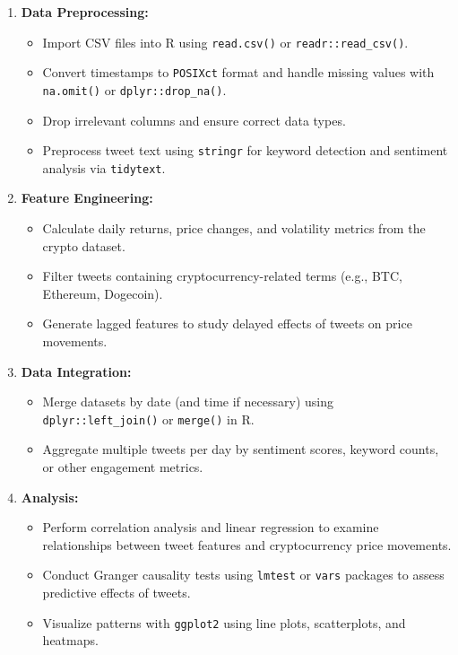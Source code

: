 \documentclass[12pt]{article}
\begin{document}
\begin{enumerate}[label=\arabic*.]
    \item \textbf{Data Preprocessing:}  
    \begin{itemize}
        \item Import CSV files into R using \texttt{read.csv()} or \texttt{readr::read\_csv()}.
        \item Convert timestamps to \texttt{POSIXct} format and handle missing values with \texttt{na.omit()} or \texttt{dplyr::drop\_na()}.
        \item Drop irrelevant columns and ensure correct data types.
        \item Preprocess tweet text using \texttt{stringr} for keyword detection and sentiment analysis via \texttt{tidytext}.
    \end{itemize}

    \item \textbf{Feature Engineering:}  
    \begin{itemize}
        \item Calculate daily returns, price changes, and volatility metrics from the crypto dataset.
        \item Filter tweets containing cryptocurrency-related terms (e.g., BTC, Ethereum, Dogecoin).
        \item Generate lagged features to study delayed effects of tweets on price movements.
    \end{itemize}

    \item \textbf{Data Integration:}  
    \begin{itemize}
        \item Merge datasets by date (and time if necessary) using \texttt{dplyr::left\_join()} or \texttt{merge()} in R.
        \item Aggregate multiple tweets per day by sentiment scores, keyword counts, or other engagement metrics.
    \end{itemize}

    \item \textbf{Analysis:}  
    \begin{itemize}
        \item Perform correlation analysis and linear regression to examine relationships between tweet features and cryptocurrency price movements.
        \item Conduct Granger causality tests using \texttt{lmtest} or \texttt{vars} packages to assess predictive effects of tweets.
        \item Visualize patterns with \texttt{ggplot2} using line plots, scatterplots, and heatmaps.
    \end{itemize}


\end{enumerate}
\end{document}
